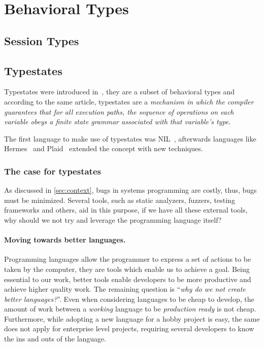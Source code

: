 \section{Behavioral Types}

\subsection{Session Types}


\subsection{Typestates}\label{sec:typestates}

Typestates were introduced in~\autocite{Strom1983},
they are a subset of behavioral types and
according to the same article, typestates are a
\emph{mechanism in which the compiler guarantees that for all execution paths,
the sequence of operations on each variable obeys a finite state grammar associated with that variable's type}.

The first language to make use of typestates was NIL~\autocite{Strom1983},
afterwards languages like Hermes~\autocite{Strom1990} and Plaid~\autocite{Aldrich2009}
extended the concept with new techniques.

\subsubsection*{The case for typestates}

As discussed in \autoref{sec:context}, bugs in systems programming are costly,
thus, bugs must be minimized.
Several tools, such as static analyzers, fuzzers, testing frameworks and others,
aid in this purpose, if we have all these external tools,
why should we not try and leverage the programming language itself?

\paragraph{Moving towards better languages.}
Programming languages allow the programmer to express a set of actions to be taken by the computer,
they are tools which enable us to achieve a goal.
Being essential to our work, better tools enable developers to be more productive and achieve higher quality work.
The remaining question is “\emph{why do we not create better languages?}”.
Even when considering languages to be cheap to develop,
the amount of work between a \emph{working} language to be \emph{production ready} is not cheap.
Furthermore, while adopting a new language for a hobby project is easy,
the same does not apply for enterprise level projects,
requiring several developers to know the ins and outs of the language.

